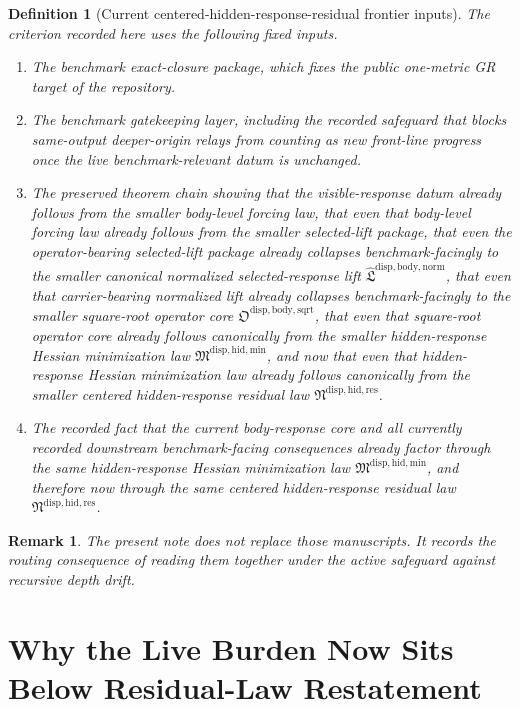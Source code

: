 \documentclass[11pt]{article}
\newcommand{\ResidualLawPackage}{\mathfrak N^{\mathrm{disp,hid,res}}}
\newcommand{\HiddenMinimizationPackage}{\mathfrak M^{\mathrm{disp,hid,min}}}
\newcommand{\SquareRootOperatorCore}{\mathfrak O^{\mathrm{disp,body,sqrt}}}
\newcommand{\NormalizedLiftPackage}{\widehat{\mathfrak L}^{\mathrm{disp,body,norm}}}
\newtheorem{definition}{Definition}
\newtheorem{remark}{Remark}
\begin{document}
\begin{definition}[Current centered-hidden-response-residual frontier inputs]
The criterion recorded here uses the following fixed inputs.
\begin{enumerate}
    \item The benchmark exact-closure package, which fixes the public one-metric GR target of the repository.
    \item The benchmark gatekeeping layer, including the recorded safeguard that blocks same-output deeper-origin relays from counting as new front-line progress once the live benchmark-relevant datum is unchanged.
    \item The preserved theorem chain showing that the visible-response datum already follows from the smaller body-level forcing law, that even that body-level forcing law already follows from the smaller selected-lift package, that even the operator-bearing selected-lift package already collapses benchmark-facingly to the smaller canonical normalized selected-response lift \(\NormalizedLiftPackage\), that even that carrier-bearing normalized lift already collapses benchmark-facingly to the smaller square-root operator core \(\SquareRootOperatorCore\), that even that square-root operator core already follows canonically from the smaller hidden-response Hessian minimization law \(\HiddenMinimizationPackage\), and now that even that hidden-response Hessian minimization law already follows canonically from the smaller centered hidden-response residual law \(\ResidualLawPackage\).
    \item The recorded fact that the current body-response core and all currently recorded downstream benchmark-facing consequences already factor through the same hidden-response Hessian minimization law \(\HiddenMinimizationPackage\), and therefore now through the same centered hidden-response residual law \(\ResidualLawPackage\).
\end{enumerate}
\end{definition}

\begin{remark}
The present note does not replace those manuscripts. It records the routing consequence of reading them together under the active safeguard against recursive depth drift.
\end{remark}

\section{Why the Live Burden Now Sits Below Residual-Law Restatement}
\end{document}
